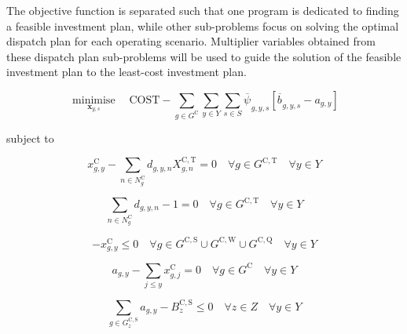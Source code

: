 \documentclass{article}
\newcommand{\sGeneratorsCandidate}{G^{\mathrm{C}}}
\newcommand{\sGeneratorsCandidateThermal}{G^{\mathrm{C,T}}}
\newcommand{\sGeneratorsCandidateWind}{G^{\mathrm{C,W}}}
\newcommand{\sGeneratorsCandidateSolar}{G^{\mathrm{C,S}}}
\newcommand{\sStorageCandidate}{G^{\mathrm{C,Q}}}
\newcommand{\sYears}{Y}
\newcommand{\sScenarios}{S}
\newcommand{\sZones}{Z}
\newcommand{\sInvestmentSizeOptions}{N^{\mathrm{C}}}
\newcommand{\sInvestmentSizeOptionsGenerator}[1][\iGenerator]{\sInvestmentSizeOptions_{#1}}
\newcommand{\iGenerator}{g}
\newcommand{\iYear}{y}
\newcommand{\iYearAlias}{j}
\newcommand{\iScenario}{s}
\newcommand{\iZone}{z}
\newcommand{\iInvestmentSizeOption}{n}
\newcommand{\cInvestmentSize}{X^{\mathrm{C,T}}_{\iGenerator,\iInvestmentSizeOption}}
\newcommand{\cBuildLimitSolar}{B^{\mathrm{C,\mathrm{S}}}_{\iZone}}
\newcommand{\cObjectiveFunction}{\mathrm{COST}}
\newcommand{\vInstalledCapacity}[1][\iGenerator,\iYear]{x^{\mathrm{C}}_{#1}}
\newcommand{\vInvestmentSizeIndicator}[1][\iGenerator,\iYear,\iInvestmentSizeOption]{d_{#1}}
\newcommand{\vInstalledCapacityTotal}[1][\iGenerator,\iYear]{a_{#1}}
\newcommand{\vInstalledCapacityTotalScenario}[1][\iGenerator,\iYear,\iScenario]{b_{#1}}
\newcommand{\vFixedCapacityDual}[1][\iGenerator,\iYear,\iScenario]{\psi_{#1}}
\DeclareMathOperator*{\minimise}{minimise}
\begin{document}
The objective function is separated such that one program is dedicated to finding a feasible investment plan, while other sub-problems focus on solving the optimal dispatch plan for each operating scenario. Multiplier variables obtained from these dispatch plan sub-problems will be used to guide the solution of the feasible investment plan to the least-cost investment plan.

\begin{equation}
\minimise\limits_{\bm{x}_{\iYear,\iScenario}} \quad \cObjectiveFunction - \sum\limits_{\iGenerator \in \sGeneratorsCandidate}\sum\limits_{\iYear \in \sYears}\sum\limits_{\iScenario \in \sScenarios} \overline{\vFixedCapacityDual[]}_{\iGenerator,\iYear,\iScenario}\left[\overline{\vInstalledCapacityTotalScenario[]}_{\iGenerator,\iYear,\iScenario} - \vInstalledCapacityTotal\right]
\end{equation}

subject to

\begin{equation}
\vInstalledCapacity - \sum\limits_{\iInvestmentSizeOption \in \sInvestmentSizeOptionsGenerator} \vInvestmentSizeIndicator \cInvestmentSize = 0 \quad \forall \iGenerator \in \sGeneratorsCandidateThermal \quad \forall \iYear \in \sYears
\label{eqn: discrete capacity decision}
\end{equation}

\begin{equation}
\sum\limits_{\iInvestmentSizeOption \in \sInvestmentSizeOptionsGenerator} \vInvestmentSizeIndicator - 1 = 0 \quad \forall \iGenerator \in \sGeneratorsCandidateThermal \quad \forall \iYear \in \sYears
\end{equation}

\begin{equation}
- \vInstalledCapacity[\iGenerator,\iYear] \leq 0 \quad \forall \iGenerator \in \sGeneratorsCandidateSolar \cup \sGeneratorsCandidateWind \cup \sStorageCandidate \quad \forall \iYear \in \sYears
\end{equation}

\begin{equation}
\vInstalledCapacityTotal - \sum\limits_{\iYearAlias \leq \iYear} \vInstalledCapacity[\iGenerator,\iYearAlias] = 0 \quad \forall \iGenerator \in \sGeneratorsCandidate \quad \forall \iYear \in \sYears
\end{equation}

\begin{equation}
\sum\limits_{\iGenerator \in \sGeneratorsCandidateSolar_{\iZone}} \vInstalledCapacityTotal - \cBuildLimitSolar \leq 0 \quad \forall \iZone \in \sZones \quad \forall \iYear \in \sYears
\end{equation}
\end{document}
